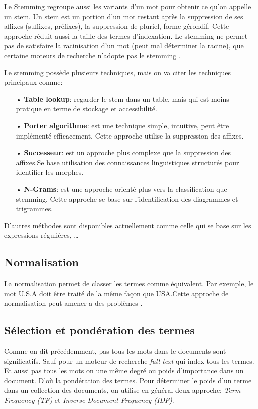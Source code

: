 Le Stemming regroupe aussi les variants d'un mot pour obtenir ce qu'on appelle un stem. Un stem est un portion d'un mot restant après la suppression de ses affixes (suffixes, préfixes), la suppression de pluriel, forme gérondif. Cette approche réduit aussi la taille des termes d'indexation. Le stemming ne permet pas de satisfaire la racinisation d'un mot (peut mal déterminer la racine), que certaine moteurs de recherche n'adopte pas le stemming \citep*{modern-ir, vsm}.

Le stemming possède plusieurs techniques, mais on va citer les techniques principaux comme:

\begin{itemize}
    \item[•] \textbf{Table lookup}: regarder le stem dans un table, mais qui est moins pratique en terme de stockage et accessibilité.
    \item[•] \textbf{Porter algorithme}: est une technique simple, intuitive, peut être implémenté efficacement. Cette approche utilise la suppression des affixes.
    \item[•] \textbf{Successeur}: est un approche plus complexe que la suppression des affixes.Se base utilisation des connaissances linguistiques structurés pour identifier les morphes.
    \item[•] \textbf{N-Grams}: est une approche orienté plus vers la classification que stemming. Cette approche se base sur l'identification des diagrammes et trigrammes.
\end{itemize}

D'autres méthodes sont disponibles actuellement comme celle qui se base sur les expressions régulières, \dots

\subsection{Normalisation}
La normalisation permet de classer les termes comme équivalent. Par exemple, le mot U.S.A doit être traité de la même façon que USA.Cette approche de normalisation peut amener a des problèmes \citep{sarch-engine-vsm}.

\subsection{Sélection et pondération des termes}
Comme on dit précédemment, pas tous les mots dans le documents sont significatifs. Sauf pour un moteur de recherche \emph{full-text} qui index tous les termes. Et aussi pas tous les mots on une même degré ou poids d'importance dans un document. D'où la pondération des termes. Pour déterminer le poids d'un terme dans un collection des documents, on utilise en général deux approche: \textit{Term Frequency (TF)} et \textit{Inverse Document Frequency (IDF)}.

